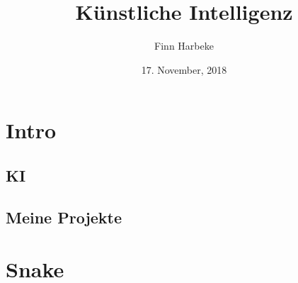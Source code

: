 \documentclass[11pt,a4paper,ngerman]{article}
\author{Finn Harbeke}
\title{Künstliche Intelligenz}
\date{17. November, 2018}
\begin{document}
\setlength\parindent{0pt}

\maketitle
\tableofcontents
\pagebreak

\section{Intro}

\subsection{KI}

\subsection{Meine Projekte}

\section{Snake}
\end{document}
